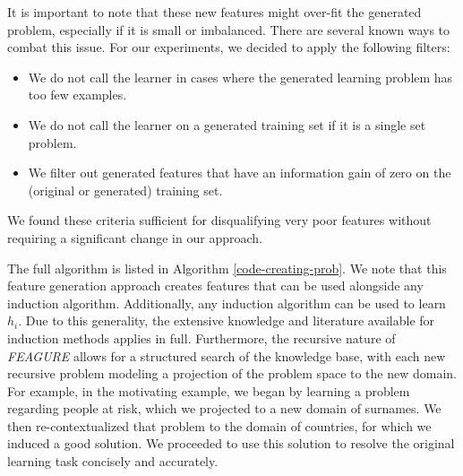 \documentclass[twoside,11pt]{article}
\theoremstyle{definition}
\begin{document}
It is important to note that these new features might over-fit the generated problem, especially if it is small or imbalanced. There are several known ways to combat this issue. For our experiments, we decided to apply the following filters:
\begin{itemize}
	\item We do not call the learner in cases where the generated learning problem has too few examples.
	\item We do not call the learner on a generated training set if it is a single set problem.
	\item We filter out generated features that have an information gain of zero on the (original or generated) training set.
\end{itemize}  

We found these criteria sufficient for disqualifying very poor features without requiring a significant change in our approach.


The full algorithm is listed in Algorithm \ref{code-creating-prob}.
We note that this feature generation approach creates features that can be used alongside any induction algorithm. Additionally, any induction algorithm can be used to learn $h_i$. Due to this generality, the extensive knowledge and literature available for induction methods applies in full. Furthermore, the recursive nature of \emph{FEAGURE} allows for a structured search of the knowledge base, with each new recursive problem modeling a projection of the problem space to the new domain. For example, in the motivating example, we began by learning a problem regarding people at risk, which we projected to a new domain of surnames. We then re-contextualized that problem to the domain of countries, for which we induced a good solution. We proceeded to use this solution to resolve the original learning task concisely and accurately.
\end{document}
